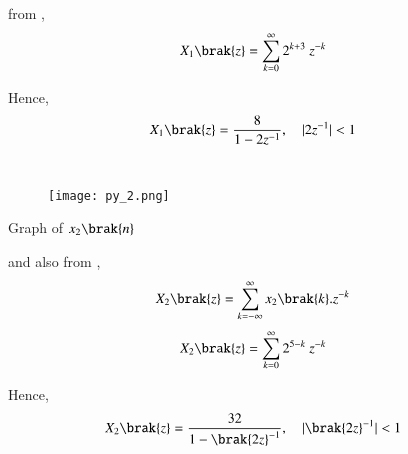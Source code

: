 \documentclass[beamer]{IEEEtran}
\theoremstyle{remark}
\begin{document}
from \brak{\ref{a11}},
\begin{align}X_1\brak{z}&=\sum_{k=0}^{\infty}2^{k+3}\ z^{-k}\end{align}

Hence,
\begin{align}
X_1\brak{z}&=\frac{8}{1-2z^{-1}},\quad |2z^{-1}|<1
\end{align}\\

\begin{figure}[h]
    \centering
    \texttt{[image: py\_2.png]}
    \label{$2^{5-n}$}
\end{figure}

\begin{center}
    Graph of $x_2\brak{n}$
\end{center}

and also from \brak{\ref{a12}},\\
\begin{align}
    X_2\brak{z}&=\sum_{k=-\infty}^{\infty} x_2\brak{k}.z^{-k}
\end{align}
\begin{align}X_2\brak{z}&=\sum_{k=0}^{\infty} 2^{5-k}\ z^{-k}\end{align}

Hence,
\begin{align}X_2\brak{z}&=\frac{32}{1-{\brak{2z}^{-1}}},\quad |{\brak{2z}^{-1}}|<1 \end{align}
\end{document}
